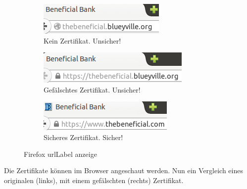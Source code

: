 \begin{figure}[H]
  \begin{subfigure}[b]{.30\linewidth}
    \centering
    \includegraphics[width=0.9\linewidth]{images/https-firefox-none.png}
    \caption{Kein Zertifikat. Unsicher!}
    \label{fig:phishing:angriffvorbereiten:angriffsvektoren:fakecertificates:firefox:none}
  \end{subfigure}%
    \begin{subfigure}[b]{.30\linewidth}
      \centering
      \includegraphics[width=0.9\linewidth]{images/https-firefox-fake.png}
      \caption{Gefälschtes Zertifikat. Unsicher!}
      \label{fig:phishing:angriffvorbereiten:angriffsvektoren:fakecertificates:firefox:secure}
    \end{subfigure}
	\begin{subfigure}[b]{.30\linewidth}
		\centering
		\includegraphics[width=0.9\linewidth]{images/https-firefox-secure.png}
		\caption{Sicheres Zertifikat. Sicher!}
		\label{fig:phishing:angriffvorbereiten:angriffsvektoren:fakecertificates:firefox:secure}
	\end{subfigure}
  \caption{Firefox \Gls{urlLabel} anzeige}
  \label{fig:phishing:angriffvorbereiten:angriffsvektoren:fakecertificates:firefox}
\end{figure}

Die Zertifikate können im Browser angeschaut werden. Nun ein Vergleich eines originalen (links), mit einem gefälschten (rechts) Zertifikat.

